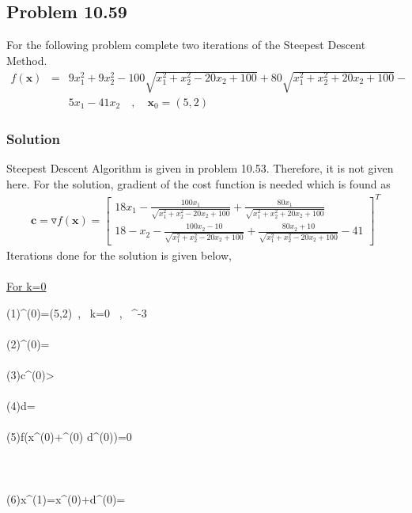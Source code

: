 \documentclass[]{report}
\begin{document}
\subsection*{Problem 10.59}
For the following problem complete two iterations of the Steepest Descent Method.
\begin{eqnarray*}
f\left(\mathbf x\right)&=&9x_1^2+9x_2^2-100\sqrt{x_1^2+x_2^2-20x_2+100}+80\sqrt{x_1^2+x_2^2+20x_2+100}-\\&&5x_1-41x_2 \quad,\quad \mathbf{x}_0=\left(5,2\right)
\end{eqnarray*}
\subsubsection*{Solution}
Steepest Descent Algorithm is given in problem 10.53. Therefore, it is not given here. For the solution, gradient of the cost function is needed which is found as
\begin{eqnarray*}
\mathbf{c}=\mathbf \triangledown f\left(\mathbf x\right)=\left[\begin{array}{c}
18x_1-\frac{100x_1}{\sqrt{x_1^2+x_2^2-20x_2+100}}+\frac{80x_1}{\sqrt{x_1^2+x_2^2+20x_2+100}} \\ 18-x_2-\frac{100x_2-10}{\sqrt{x_1^2+x_2^2-20x_2+100}}+\frac{80x_2+10}{\sqrt{x_1^2+x_2^2-20x_2+100}}-41\end{array}\right]^T
\end{eqnarray*}
Iterations done for the solution is given below,
\\
~
\\
\underline{For k=0}
\begin{program}
\left(1\right)\quad {}^{(0)}=\left(5,2\right)\ , \, k=0 \ , \ ^{-3}\\~ \\
\left(2\right)\quad {}^{(0)}=\left[62.7693 \ , \ 153.6460\right]\\~  \\
\left(3\right)\quad \lvert \mathbf c^{(0)}>\epsilon\\~  \\
\left(4\right)\quad \mathbf d=\left[-62.7693 \ , \ -153.6460\right]\\~  \\
\left(5\right)\quad \delta f\left(\mathbf x^{(0)}+\alpha^{(0)} \mathbf d^{(0)}\right)=0\\~\\
\quad \quad \quad \quad \quad \quad \quad \quad \quad {}\\~\\
\left(6\right)\quad \mathbf x^{(1)}=\mathbf x^{(0)}+\mathbf d^{(0)}=\left[0.802\ , \ -8.279\right]\\~  \\
\end{program}~
\end{document}
